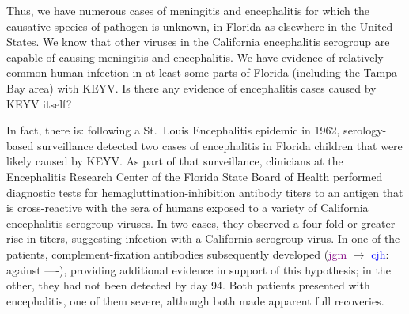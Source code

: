 \documentclass[12pt]{article}
\newcommand{\eg}{\textit{e.g.}}
\newcommand{\cjh}{\textcolor{blue}{cjh}}
\newcommand{\tjh}{\textcolor{red}{tjh}}
\newcommand{\jal}{\textcolor{green}{jal}}
\newcommand{\jgm}{\textcolor{purple}{jgm}}
\newcommand{\msg}[3]{(#1 $\rightarrow$ #2: #3)}
\newcommand{\mtc}[1]{\msg\tjh\cjh{#1}}
\newcommand{\mjc}[1]{\msg\jal\cjh{#1}}
\newcommand{\mgc}[1]{\msg\jgm\cjh{#1}}
\begin{document}
        

        Thus, we have numerous cases of meningitis and encephalitis for which the causative species of pathogen is unknown, in Florida as elsewhere in the United States. %
        We know that other viruses in the California encephalitis serogroup are capable of causing meningitis and encephalitis.  We have evidence of relatively common human infection in at least some parts of Florida (including the Tampa Bay area) with KEYV. Is there any evidence of encephalitis cases caused by KEYV itself?

        In fact, there is: following a St.\ Louis Encephalitis epidemic in 1962, serology-based surveillance detected two cases of encephalitis in Florida children that were likely caused by KEYV. As part of that surveillance, clinicians at the Encephalitis Research Center of the Florida State Board of Health performed diagnostic tests for hemagluttination-inhibition antibody titers to an antigen that is cross-reactive with the sera of humans exposed to a variety of California encephalitis serogroup viruses. In two cases, they observed a four-fold or greater rise in titers, suggesting infection with a California serogroup virus. In one of the patients, complement-fixation antibodies subsequently developed \mgc{against ----}, providing additional evidence in support of this hypothesis; in the other, they had not been detected by day 94. Both patients presented with encephalitis, one of them severe, although both made apparent full recoveries.\cite{bond1966california}
\end{document}
